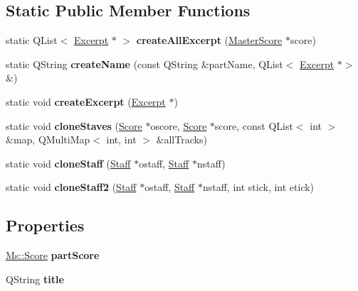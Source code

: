 \subsection*{Static Public Member Functions}
\begin{DoxyCompactItemize}
\item 
\mbox{\label{class_ms_1_1_excerpt_a3285b9252a8366a27adbe16384010aea}} 
static Q\+List$<$ \hyperlink{class_ms_1_1_excerpt}{Excerpt} $\ast$ $>$ {\bfseries create\+All\+Excerpt} (\hyperlink{class_ms_1_1_master_score}{Master\+Score} $\ast$score)
\item 
\mbox{\label{class_ms_1_1_excerpt_ac491f6cf0d2f8e686e5e21412e8f4c43}} 
static Q\+String {\bfseries create\+Name} (const Q\+String \&part\+Name, Q\+List$<$ \hyperlink{class_ms_1_1_excerpt}{Excerpt} $\ast$$>$ \&)
\item 
\mbox{\label{class_ms_1_1_excerpt_aca9a4917c3083e4a0d1bd41841e270ef}} 
static void {\bfseries create\+Excerpt} (\hyperlink{class_ms_1_1_excerpt}{Excerpt} $\ast$)
\item 
\mbox{\label{class_ms_1_1_excerpt_a5d78906d9789b2cabef3cc857ea340a8}} 
static void {\bfseries clone\+Staves} (\hyperlink{class_ms_1_1_score}{Score} $\ast$oscore, \hyperlink{class_ms_1_1_score}{Score} $\ast$score, const Q\+List$<$ int $>$ \&map, Q\+Multi\+Map$<$ int, int $>$ \&all\+Tracks)
\item 
\mbox{\label{class_ms_1_1_excerpt_a8a1a0502343de780074b3c6b0a50fdcd}} 
static void {\bfseries clone\+Staff} (\hyperlink{class_ms_1_1_staff}{Staff} $\ast$ostaff, \hyperlink{class_ms_1_1_staff}{Staff} $\ast$nstaff)
\item 
\mbox{\label{class_ms_1_1_excerpt_ac44cea8974631df566d8f2c6f9c3bd74}} 
static void {\bfseries clone\+Staff2} (\hyperlink{class_ms_1_1_staff}{Staff} $\ast$ostaff, \hyperlink{class_ms_1_1_staff}{Staff} $\ast$nstaff, int stick, int etick)
\end{DoxyCompactItemize}
\subsection*{Properties}
\begin{DoxyCompactItemize}
\item 
\mbox{\label{class_ms_1_1_excerpt_af85b33e43a09c08e93810b4f99a77903}} 
\hyperlink{class_ms_1_1_score}{Ms\+::\+Score} {\bfseries part\+Score}
\item 
\mbox{\label{class_ms_1_1_excerpt_ade369c4e241c5cd0a8b8f92998fe9430}} 
Q\+String {\bfseries title}
\end{DoxyCompactItemize}


